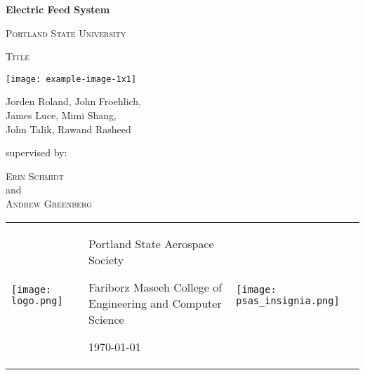 \documentclass[11pt,twoside,a4paper,openright]{report}
\begin{document}
\begin{titlepage}

	\centering
	{\huge\bfseries Electric Feed System\par}
	\vspace{0.5cm}
	{\scshape\LARGE Portland State University \par}
	\vspace{0.5cm}
	{\scshape\Large Title \par}%
	\vspace{1cm}
		\texttt{[image: example-image-1x1]}\par\vspace{1cm}

	{\Large\itshape 	{Jorden Roland, 
John Froehlich,\\
James Luce, 
Mimi Shang,\\
John Talik, 
Rawand Rasheed\par}}
	\vfill
	supervised by:\par
    \textsc{Erin Schmidt}\\
	and\\
	\textsc{Andrew Greenberg}

	\vspace{3cm}


\centering
\begin{table*}[!b]


  \begin{tabular}{  p{2cm}  m{15.5cm}  p{3cm}  }
  
\begin{minipage}{.3\textwidth}
      \texttt{[image: logo.png]}
    \end{minipage}
&
 \centering
{Portland State Aerospace Society}\par
{Fariborz Maseeh College of Engineering and Computer Science}\par
{\large \today \par}
&	
\begin{minipage}{.3\textwidth}
      \texttt{[image: psas\_insignia.png]}
    \end{minipage}
    
\end{tabular}
\end{table*}

\end{titlepage}
\end{document}
